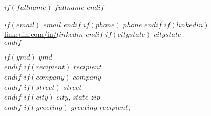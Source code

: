 \begin{center}
$if(fullname)$
{\fontsize{18}{0}\selectfont\scshape $fullname$ \vspace{-0.1in}}
$endif$
\end{center}
\begin{center}
$if(email)$
\href{mailto: $email$}{\faEnvelope\enspace $email$}\hfill
$endif$
$if(phone)$
\href{tel: $phone$}{\faPhone\enspace $phone$}\hfill
$endif$
$if(linkedin)$
\href{https://linkedin.com/in/$linkedin$}{\faLinkedinIn\enspace linkedin.com/in/$linkedin$}\hfill
$endif$
$if(citystate)$
\faMapMarker\enspace $citystate$\\
$endif$
\noindent\makebox[\linewidth]{\rule{\textwidth}{0.5pt}}
\end{center}
\renewcommand{\labelitemi}{-}
$if(ymd)$
$ymd$\vspace{0.1in}\\
$endif$
$if(recipient)$
$recipient$\\
$endif$
$if(company)$
$company$\\
$endif$
$if(street)$
$street$\\
$endif$
$if(city)$
$city$, $state$ $zip$\vspace{0.1in}\\
$endif$
$if(greeting)$
\vspace{-0.1in}$greeting$ $recipient$,\vspace{0.1in}\\

